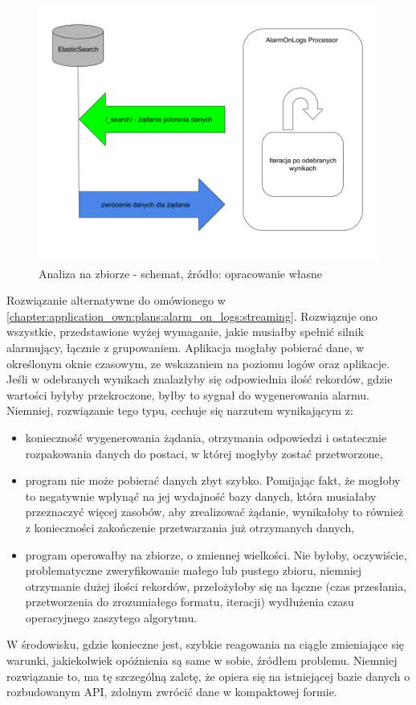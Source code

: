     \begin{figure}[H]
        \centering
        \includegraphics[width=1.0\textwidth]{images/aol_batch}
        \caption[Analiza na zbiorze - schemat]{
            Analiza na zbiorze - schemat, 
            źródło: opracowanie własne
        }
        \label{chapter:application_own:plans:alarm_on_logs:bulk:diagram}
    \end{figure}
    
    Rozwiązanie alternatywne do omówionego w \ref{chapter:application_own:plans:alarm_on_logs:streaming}. Rozwiązuje ono wszystkie, przedstawione
    wyżej wymaganie, jakie musiałby spełnić silnik alarmujący, łącznie z grupowaniem. Aplikacja mogłaby pobierać dane, w określonym oknie czasowym,
    ze wskazaniem na poziomu logów oraz aplikacje. Jeśli w odebranych wynikach znalazłyby się odpowiednia
    ilość rekordów, gdzie wartości byłyby przekroczone, byłby to sygnał do wygenerowania alarmu. Niemniej, rozwiązanie tego typu, cechuje się
    narzutem wynikającym z:
    \begin{itemize}
        \item konieczność wygenerowania żądania, otrzymania odpowiedzi i ostatecznie rozpakowania danych do postaci, w której mogłyby zostać
        przetworzone,
        \item program nie może pobierać danych zbyt szybko. Pomijając fakt, że mogłoby to negatywnie wpłynąć na jej wydajność bazy danych, która
        musiałaby przeznaczyć więcej zasobów, aby zrealizować żądanie, wynikałoby to również z konieczności zakończenie przetwarzania już
        otrzymanych danych,
        \item program operowałby na zbiorze, o zmiennej wielkości. Nie byłoby, oczywiście, problematyczne zweryfikowanie małego lub pustego zbioru,
        niemniej otrzymanie dużej ilości rekordów, przełożyłoby się na łączne (czas przesłania, przetworzenia do zrozumiałego formatu, iteracji)
        wydłużenia czasu operacyjnego zaszytego algorytmu. 
    \end{itemize}
    W środowisku, gdzie konieczne jest, szybkie reagowania na ciągle zmieniające się warunki, jakiekolwiek opóźnienia są same w sobie, źródłem
    problemu. Niemniej rozwiązanie to, ma tę szczególną zaletę, że opiera się na istniejącej bazie danych o rozbudowanym API, zdolnym
    zwrócić dane w kompaktowej formie.
    
